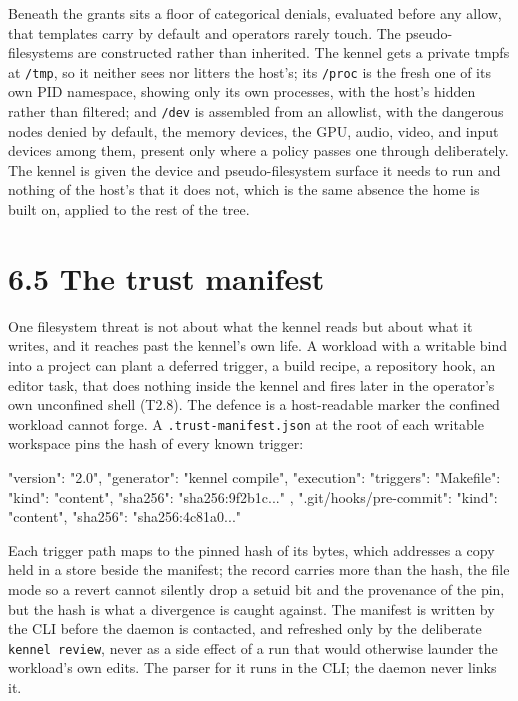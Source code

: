 Beneath the grants sits a floor of categorical denials, evaluated before
any allow, that templates carry by default and operators rarely touch.
The pseudo-filesystems are constructed rather than inherited. The kennel
gets a private tmpfs at \texttt{/tmp}, so it neither sees nor litters
the host's; its \texttt{/proc} is the fresh one of its own PID
namespace, showing only its own processes, with the host's hidden rather
than filtered; and \texttt{/dev} is assembled from an allowlist, with
the dangerous nodes denied by default, the memory devices, the GPU,
audio, video, and input devices among them, present only where a policy
passes one through deliberately. The kennel is given the device and
pseudo-filesystem surface it needs to run and nothing of the host's that
it does not, which is the same absence the home is built on, applied to
the rest of the tree.

\hypertarget{the-trust-manifest}{%
\section{6.5 The trust manifest}\label{the-trust-manifest}}

One filesystem threat is not about what the kennel reads but about what
it writes, and it reaches past the kennel's own life. A workload with a
writable bind into a project can plant a deferred trigger, a build
recipe, a repository hook, an editor task, that does nothing inside the
kennel and fires later in the operator's own unconfined shell (T2.8).
The defence is a host-readable marker the confined workload cannot
forge. A \texttt{.trust-manifest.json} at the root of each writable
workspace pins the hash of every known trigger:

\begin{kennelcode}
{
  "version": "2.0",
  "generator": "kennel compile",
  "execution": {
    "triggers": {
      "Makefile":              { "kind": "content", "sha256": "sha256:9f2b1c..." },
      ".git/hooks/pre-commit": { "kind": "content", "sha256": "sha256:4c81a0..." }
    }
  }
}
\end{kennelcode}

Each trigger path maps to the pinned hash of its bytes, which addresses
a copy held in a store beside the manifest; the record carries more than
the hash, the file mode so a revert cannot silently drop a setuid bit
and the provenance of the pin, but the hash is what a divergence is
caught against. The manifest is written by the CLI before the daemon is
contacted, and refreshed only by the deliberate \texttt{kennel\ review},
never as a side effect of a run that would otherwise launder the
workload's own edits. The parser for it runs in the CLI; the daemon
never links it.

